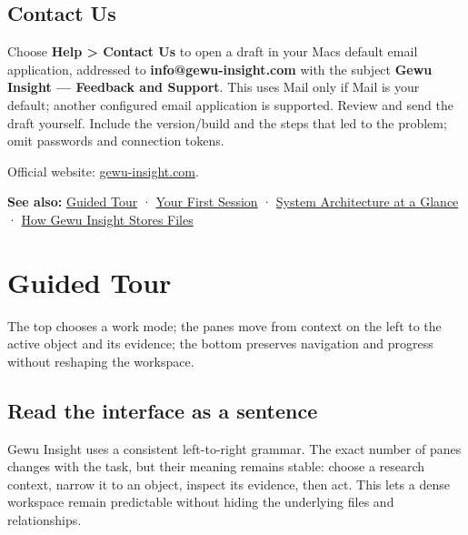 \documentclass[10pt,letterpaper,oneside]{scrreprt}
\newenvironment{GewuRelated}{\par\nobreak\vspace{3pt}\nobreak\begingroup\small\sffamily\begin{samepage}\noindent}{\par\end{samepage}\endgroup}
\newenvironment{GewuLead}
  {\begin{list}{}{\leftmargin=0pt\rightmargin=0pt\topsep=0pt\partopsep=0pt\parsep=0pt}\item\relax
    \sffamily\fontsize{10.5}{13.2}\selectfont\color{GewuMuted}}
  {\end{list}}
\begin{document}
\section{Contact Us}\label{contact-us}

Choose \textbf{Help \textgreater{} Contact Us} to open a draft in your Mac\textquotesingle s default email application, addressed to \textbf{info@gewu-insight.com} with the subject \textbf{Gewu Insight --- Feedback and Support}. This uses Mail only if Mail is your default; another configured email application is supported. Review and send the draft yourself. Include the version/build and the steps that led to the problem; omit passwords and connection tokens.

Official website: \href{http://gewu-insight.com}{gewu-insight.com}.

\begin{GewuRelated}
\textbf{See also:} \hyperref[guided-tour]{Guided Tour} · \hyperref[first-session]{Your First Session} · \hyperref[system-overview]{System Architecture at a Glance} · \hyperref[storage-model]{How Gewu Insight Stores Files}
\end{GewuRelated}

\chapter{Guided Tour}\label{guided-tour}

\begin{GewuLead}
The top chooses a work mode; the panes move from context on the left to the active object and its evidence; the bottom preserves navigation and progress without reshaping the workspace.
\end{GewuLead}

\section{Read the interface as a sentence}\label{read-the-interface-as-a-sentence}

Gewu Insight uses a consistent left-to-right grammar. The exact number of panes changes with the task, but their meaning remains stable: choose a research context, narrow it to an object, inspect its evidence, then act. This lets a dense workspace remain predictable without hiding the underlying files and relationships.
\end{document}
